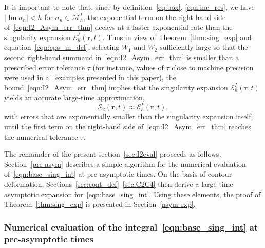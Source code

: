 \documentclass[11pt]{article}
\theoremstyle{plain}
\theoremstyle{remark}
\def \br{\mathbf{r}}
\renewcommand{\Im}{\operatorname{Im}}
\begin{document}
It is important to note that, since by
definition~\eqref{eq:box}, \eqref{eqn:inc_res}, we have
$|\Im{\sigma_n}| < h$ for $\sigma_n\in\mathcal{M}_h^I$, the
exponential term on the right hand side of~\eqref{eqn:I2_Asym_err_thm}
decays at a faster exponential rate than the singularity expansion
$\mathcal{E}_h^{I}(\br,t)$. Thus in view of Theorem~\ref{thm:sing_exp}
and equation~\eqref{eqn:eps_m_def}, selecting $W_1$ and $W_2$
sufficiently large so that the second right-hand summand
in~\eqref{eqn:I2_Asym_err_thm} is smaller than a prescribed error
tolerance $\tau$ (for instance, values of $\tau$ close to machine
precision were used in all examples presented in this paper), the
bound~\eqref{eqn:I2_Asym_err_thm} implies that the singularity
expansion $\mathcal{E}_h^{I}(\br,t)$ yields an accurate large-time
approximation,
\begin{equation}\label{eqn:I2_asym_exp}
\mathcal{I}_2(\br,t) \approx \mathcal{E}_h^{I}(\br,t),
\end{equation}
with errors that are exponentially smaller than the singularity
expansion itself, until the first term on the right-hand side
of~\eqref{eqn:I2_Asym_err_thm} reaches the numerical tolerance $\tau$.

The remainder of the present section~\ref{sec:I2eval} proceeds as
follows. Section~\ref{pre-asym} describes a simple algorithm for the
numerical evaluation of~\eqref{eqn:base_sing_int} at pre-asymptotic
times. On the basis of contour deformation,
Sections~\ref{sec:cont_def}--\ref{sec:C2C4} then derive a large time
asymptotic expansion for~\eqref{eqn:base_sing_int}. Using these
elements, the proof of Theorem~\ref{thm:sing_exp} is presented in
Section~\ref{asym-exp}.

\subsubsection{Numerical evaluation of the integral~\eqref{eqn:base_sing_int} at pre-asymptotic times\label{pre-asym}}
  
\end{document}
